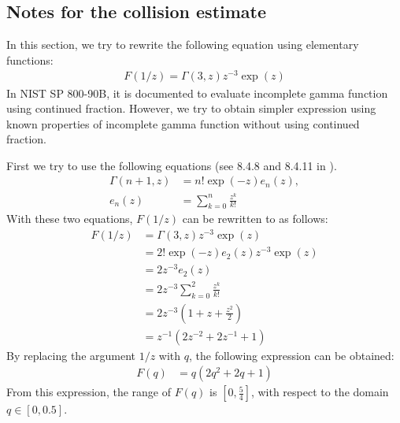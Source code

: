 ﻿\documentclass[a4paper,xelatex,english]{bxjsarticle}
\begin{document}
\clearpage
\subsection{Notes for the collision estimate}
In this section, we try to rewrite the following equation using elementary functions:
\begin{align}
F(1/z) = \Gamma(3,z)z^{-3}\exp(z) 
\label{eq:Fin632}
\end{align}
In NIST SP 800-90B\cite{SP80090B}, it is documented to evaluate incomplete gamma function using continued fraction.
However, we try to obtain simpler expression using known properties of incomplete gamma function without using continued fraction.

First we try to use the following equations (see 8.4.8 and 8.4.11 in \cite{MathHandbook}).
\begin{align}
\Gamma(n + 1, z) &= n!\exp(-z) e_{n}(z), \\
e_{n}(z) &= \sum_{k = 0}^{n}\frac{z^{k}}{k!}
\end{align}
With these two equations, $F(1/z)$ can be rewritten to as follows:
\begin{align}
F(1/z) &= \Gamma(3,z)z^{-3}\exp(z) \nonumber \\
&= 2!\exp(-z) e_{2}(z) z^{-3} \exp(z) \nonumber \\
&= 2 z^{-3} e_{2}(z) \nonumber \\
&= 2 z^{-3} \sum_{k = 0}^{2}\frac{z^{k}}{k!} \nonumber \\
&= 2 z^{-3} \left( 1 + z + \frac{z^{2}}{2} \right) \nonumber \\
&= z^{-1} \left( 2z^{-2} + 2z^{-1} + 1 \right) 
\label{eq:rewFin632}
\end{align}
By replacing the argument $1/z$ with $q$, the following expression can be obtained:
\begin{align}
F(q) &= q \left( 2q^{2} + 2q + 1 \right) \label{eq:rewFin632final}
\end{align}
From this expression, the range of $F(q)$ is $[0, \frac{5}{4}]$, with respect to the domain $q \in [0, 0.5]$.
\end{document}
